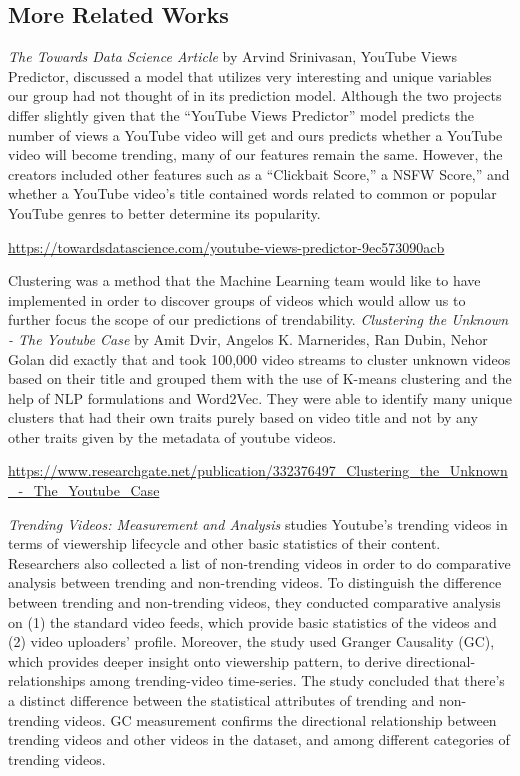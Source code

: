 \documentclass{article}
\begin{document}
\subsection*{More Related Works}

\textit{The Towards Data Science Article} by Arvind Srinivasan, YouTube Views Predictor, discussed a model that utilizes very interesting and unique variables our group had not thought of in its prediction model. Although the two projects differ slightly given that the “YouTube Views Predictor” model predicts the number of views a YouTube video will get and ours predicts whether a YouTube video will become trending, many of our features remain the same. However, the creators included other features such as a “Clickbait Score,” a NSFW Score,” and whether a YouTube video’s title contained words related to common or popular YouTube genres to better determine its popularity. \smallskip

\href{https://towardsdatascience.com/youtube-views-predictor-9ec573090acb}{https://towardsdatascience.com/youtube-views-predictor-9ec573090acb} \medskip

\par Clustering was a method that the Machine Learning team would like to have implemented in order to discover groups of videos which would allow us to further focus the scope of our predictions of trendability. \textit{Clustering the Unknown - The Youtube Case} by Amit Dvir, Angelos K. Marnerides, Ran Dubin, Nehor Golan did exactly that and took 100,000 video streams to cluster unknown videos based on their title and grouped them with the use of K-means clustering and the help of NLP formulations and Word2Vec. They were able to identify many unique clusters that had their own traits purely based on video title and not by any other traits given by the metadata of youtube videos. \smallskip

\href{https://www.researchgate.net/publication/332376497_Clustering_the_Unknown_-_The_Youtube_Case}{https://www.researchgate.net/publication/332376497_Clustering_the_Unknown_-_The_Youtube_Case} \medskip


\textit{Trending Videos: Measurement and Analysis} studies Youtube’s trending videos in terms of viewership lifecycle and other basic statistics of their content. Researchers also collected a list of non-trending videos in order to do comparative analysis between trending and non-trending videos. To distinguish the difference between trending and non-trending videos, they conducted comparative analysis on (1) the standard video feeds, which provide basic statistics of the videos and (2) video uploaders’ profile. Moreover, the study used Granger Causality (GC), which provides deeper insight onto viewership pattern, to derive directional-relationships among trending-video time-series. The study concluded that there’s a distinct difference between the statistical attributes of trending and non-trending videos. GC measurement confirms the directional relationship between trending videos and other videos in the dataset, and among different categories of trending videos. \smallskip
\end{document}
